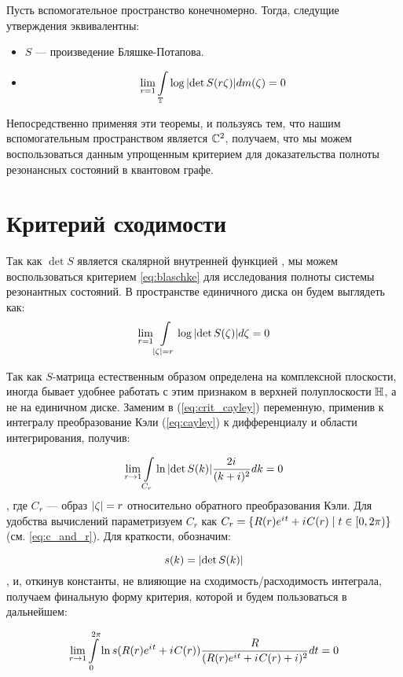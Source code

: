 \begin{theorem}
Пусть вспомогательное пространство конечномерно. Тогда, следущие утверждения эквивалентны:
\begin{itemize}
\item $S$ — произведение Бляшке-Потапова.
\item
\begin{equation}\label{eq:blaschke}
\lim\limits_{r = 1} \int\limits_{\mathbb{T}} \log \abs{\det S(r \zeta)} d m(\zeta) = 0
\end{equation}
\end{itemize}
\end{theorem}
Непосредственно применяя эти теоремы, и пользуясь тем, что нашим вспомогательным пространством является $\mathbb{C}^2$, получаем, что мы можем воспользоваться данным упрощенным критерием для доказательства полноты резонансных состояний в квантовом графе.

\section{Критерий сходимости}

Так как $\det S$ является скалярной внутренней функцией \cite{nikol2012treatise}, мы можем воспользоваться критерием \ref{eq:blaschke} для исследования полноты системы резонантных состояний. В пространстве единичного диска он будем выглядеть как:
\begin{equation}\label{eq:crit_cayley}
\lim\limits_{r = 1} \int\limits_{\abs{\zeta} = r} \log \abs{\det S(\zeta)} d \zeta = 0
\end{equation}

Так как $S$-матрица естественным образом определена на комплексной плоскости, иногда бывает удобнее работать с этим признаком в верхней полуплоскости $\mathbb{H}$, а не на единичном диске. Заменим в (\ref{eq:crit_cayley}) переменную, применив к интегралу преобразование Кэли (\ref{eq:cayley}) к дифференциалу и области интегрирования, получив:

\begin{equation}\label{eq:crit}
\lim\limits_{r \to 1} \int\limits_{C_r} \ln \abs{\det S(k)} \frac{2 {i\mkern1mu}}{(k + i)^2} dk = 0
\end{equation}
, где $C_r$ — образ $\abs{\zeta} = r$ относительно обратного преобразования Кэли. Для удобства вычислений параметризуем $C_r$ как $C_r = \{R(r) e^{{i\mkern1mu} t} + {i\mkern1mu} C(r) \mid t \in [0, 2 \pi)\}$ (см. \ref{eq:c_and_r}). Для краткости, обозначим:

\[
s(k) = \abs{\det S(k)}
\]
, и, откинув константы, не влияющие на сходимость/расходимость интеграла, получаем финальную форму критерия, которой и будем пользоваться в дальнейшем:

\begin{equation}\label{eq:critp}
\lim\limits_{r \to 1} \int\limits_{0}^{2 \pi} \ln s(R(r) e^{{i\mkern1mu} t} + {i\mkern1mu} C(r)) \frac{R}{(R(r) e^{{i\mkern1mu} t} + {i\mkern1mu} C(r) + i)^2} dt = 0
\end{equation}
